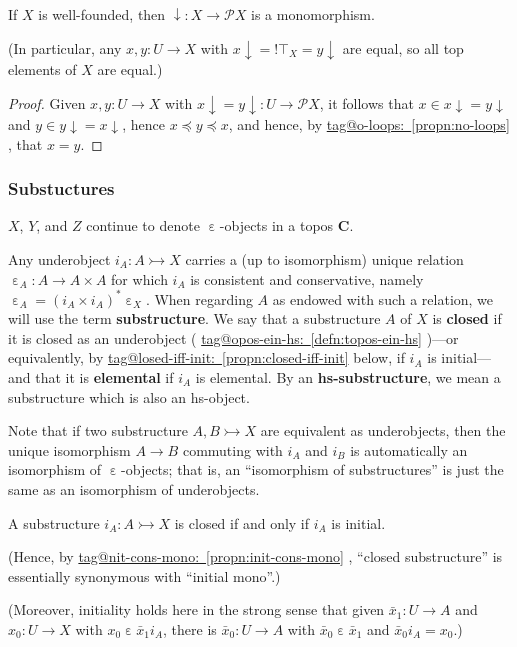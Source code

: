\documentclass{amsart}
\makeatletter
\newcommand\bC{\mathbf{C}}
\newcommand\defword[1]{{\boldmath \textbf{#1}}}
\newcommand\dwn{\mathpunct{\downarrow}}
\newcommand\ein{\mathrel{\varepsilon}}
\newcommand\pow{\mathcal{P}}
\newcommand\tto{\rightarrowtail}
\newcommand\unein{{\ein}}
\newcommand\unex{{!}}
\newcommand\prooflabel[1]{\gdef\proof@label{#1}}
\def\proof@label{}
\newcommand\tagword[1]{\csname tag@#1\endcsname}
\def\label@tag#1:#2\@nil{#1}
\newcommand\labeltag[1]{\label@tag#1:\@nil}
\newcommand\jref[1]{%
  \texorpdfstring%
    {\hyperref[#1]{\tagword{\labeltag{#1}}~\ref*{#1}}}%
    {\tagword{\labeltag{#1}}~\ref*{#1}}%
}
\theoremstyle{definition}
\theoremstyle{remark}
\theoremstyle{plainwithref}
\makeatother
\begin{document}
\begin{cor} \label{cor:dwn-mono}
  If \( X \) is well-founded, then \( \dwn \colon X \to \pow X \) is a monomorphism.

  \noindent
  (In particular, any \( x, y \colon U \to X \) with \( x \dwn = \unex \top_X = y \dwn \) are equal, so all top elements of \( X \) are equal.)
\end{cor}

\begin{proof}
  Given \( x,y \colon U \to X \) with \( x \dwn = y \dwn \colon U \to \pow X \), it follows that \( x \in x \dwn = y \dwn \) and \( y \in y \dwn = x \dwn \), hence \( x \preceq y \preceq x \), and hence, by \jref{propn:no-loops}, that \( x = y \).
\end{proof}

\subsubsection{Substuctures}
\( X \), \( Y \), and \( Z \) continue to denote \( \unein \)-objects in a topos \( \bC \).

\begin{defn}
  Any underobject \( i_A \colon A \tto X \) carries a (up to isomorphism) unique relation \( \unein_A \colon A \to A \times A \) for which \( i_A \) is consistent and conservative, namely \( \unein_A = (i_A \times i_A)^* \ein_X \).
  When regarding \( A \) as endowed with such a relation, we will use the term \defword{substructure}.
  We say that a substructure \( A \) of \( X \) is \defword{closed} if it is closed as an underobject (\jref{defn:topos-ein-hs})---or equivalently, by \jref{propn:closed-iff-init} below, if \( i_A \) is initial---and that it is \defword{elemental} if \( i_A \) is elemental.
  By an \defword{hs-substructure}, we mean a substructure which is also an hs-object.

  Note that if two substructure \( A,B \tto X \) are equivalent as underobjects, then the unique isomorphism \( A \to B \) commuting with \( i_A \) and \( i_B \) is automatically an isomorphism of \( \unein \)-objects; that is, an ``isomorphism of substructures'' is just the same as an isomorphism of underobjects.
\end{defn}

\prooflabel{proof:closed-iff-init}
\begin{propn} \label{propn:closed-iff-init}
  A substructure \( i_A \colon A \tto X \) is closed if and only if \( i_A \) is initial.

  \noindent
  (Hence, by \jref{propn:init-cons-mono}, ``closed substructure'' is essentially synonymous with ``initial mono''.)

  \noindent
  (Moreover, initiality holds here in the strong sense that given \( \bar x_1 \colon U \to A \) and \( x_0 \colon U \to X \) with \( x_0 \ein \bar x_1 i_A \), there is \( \bar x_0 \colon U \to A \) with \( \bar x_0 \ein \bar x_1 \) and \( \bar x_0 i_A = x_0 \).)
\end{propn}
\end{document}
